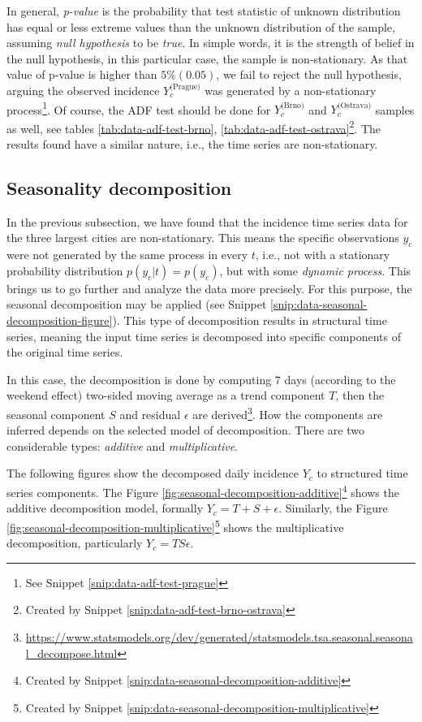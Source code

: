 \documentclass[
  digital, %
  oneside, %
  lof,     %
  lot,     %
]{fithesis4}
\begin{document}


In general, \textit{p-value} is the probability that test statistic of unknown distribution has equal or less extreme values than the unknown distribution of the sample, assuming \textit{null hypothesis} to be \textit{true}.
In simple words, it is the strength of belief in the null hypothesis, in this particular case, the sample is non-stationary. 
As that value of p-value is higher than $5\% (0.05)$, we fail to reject the null hypothesis, arguing the observed incidence $Y_c^\text{(Prague)}$ was generated by a non-stationary process\footnote{See Snippet \ref{snip:data-adf-test-prague}}. 
Of course, the ADF test should be done for $Y_c^\text{(Brno)}$ and $Y_c^\text{(Ostrava)}$ samples as well, see tables \ref{tab:data-adf-test-brno}, \ref{tab:data-adf-test-ostrava}\footnote{Created by Snippet \ref{snip:data-adf-test-brno-ostrava}}.
The results found have a similar nature, i.e., the time series are non-stationary.

\subsection{Seasonality decomposition}
\label{sec:seasonality-decomposition}

In the previous subsection, we have found that the incidence time series data for the three largest cities are non-stationary. 
This means the specific observations $y_{c}$ were not generated by the same process in every $t$, i.e., not with a stationary probability distribution $p(y_c | t) = p(y_c)$, but with some \textit{dynamic process}. 
This brings us to go further and analyze the data more precisely. 
For this purpose, the seasonal decomposition may be applied (see Snippet \ref{snip:data-seasonal-decomposition-figure}). 
This type of decomposition results in structural time series, meaning the input time series is decomposed into specific components of the original time series.

In this case, the decomposition is done by computing 7 days (according to the weekend effect) two-sided moving average as a trend component $T$, then the seasonal component $S$ and residual $\epsilon$ are derived\footnote{\url{https://www.statsmodels.org/dev/generated/statsmodels.tsa.seasonal.seasonal_decompose.html}}. 
How the components are inferred depends on the selected model of decomposition. There are two considerable types: \textit{additive} and \textit{multiplicative}.

The following figures show the decomposed daily incidence $Y_c$ to structured time series components. 
The Figure \ref{fig:seasonal-decomposition-additive}\footnote{Created by Snippet \ref{snip:data-seasonal-decomposition-additive}} shows the additive decomposition model, formally $Y_c = T + S + \epsilon$.
Similarly, the Figure \ref{fig:seasonal-decomposition-multiplicative}\footnote{Created by Snippet \ref{snip:data-seasonal-decomposition-multiplicative}} shows the multiplicative decomposition, particularly $Y_c = T S \epsilon$.
\end{document}
